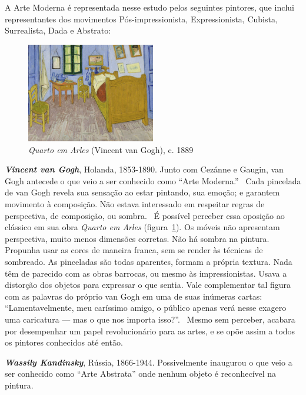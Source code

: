 A Arte Moderna é representada nesse estudo pelos seguintes pintores,
que inclui representantes dos movimentos Pós-impressionista,
Expressionista, Cubista, Surrealista, Dada e Abstrato:

\begin{figure}
  \vspace{-15pt}
  \begin{centering}
    \caption{\emph{Quarto em Arles} (Vincent van Gogh), c. 1889}
    \label{fig:vangogh:quarto}
    \includegraphics[width=0.5\textwidth]{figs/vangogh_quarto.png}
  \end{centering}
\end{figure}

\textbf{\emph{Vincent van Gogh}}, Holanda, 1853-1890. Junto com
Cezánne e Gaugin, van Gogh antecede o que veio a ser conhecido como
``Arte Moderna.''~\cite{gombrich} Cada pincelada de van Gogh revela
sua sensação ao estar pintando, sua emoção; e garantem movimento à
composição. Não estava interessado em respeitar regras de perspectiva,
de composição, ou sombra.~\cite{hulsker} É possível perceber essa
oposição ao clássico em sua obra \textit{Quarto em Arles}
(figura~\ref{fig:vangogh:quarto}). Os móveis não apresentam
perspectiva, muito menos dimensões corretas. Não há sombra na
pintura. Propunha usar as cores de maneira franca, sem se render às
técnicas de sombreado. As pinceladas são todas aparentes, formam a
própria textura. Nada têm de parecido com as obras barrocas, ou mesmo
às impressionistas. Usava a distorção dos objetos para expressar o que
sentia. Vale complementar tal figura com as palavras do próprio van
Gogh em uma de suas inúmeras cartas: ``Lamentavelmente, meu caríssimo
amigo, o público apenas verá nesse exagero uma caricatura --- mas o
que nos importa isso?''.~\cite{van1958} Mesmo sem perceber, acabara
por desempenhar um papel revolucionário para as artes, e se opõe assim
a todos os pintores conhecidos até então.

\textbf{\emph{Wassily Kandinsky}}, Rússia, 1866-1944. Possivelmente
inaugurou o que veio a ser conhecido como ``Arte Abstrata'' onde
nenhum objeto é reconhecível na pintura.~\cite{duchting} 

